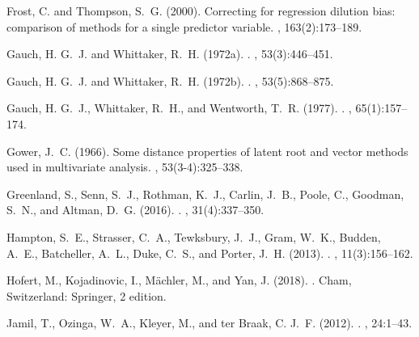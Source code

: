 \documentclass[a4paper,11pt]{article}
\begin{document}
\begin{thebibliography}{}
Frost, C. and Thompson, S.~G. (2000).
\newblock Correcting for regression dilution bias: comparison of methods for a
  single predictor variable.
, 163(2):173--189.

{Gauch}, H. G.~J. and Whittaker, R.~H. (1972a).
.
, 53(3):446--451.

{Gauch}, H. G.~J. and Whittaker, R.~H. (1972b).
.
, 53(5):868--875.

{Gauch}, H. G.~J., Whittaker, R.~H., and Wentworth, T.~R. (1977).
.
, 65(1):157--174.

Gower, J.~C. (1966).
\newblock Some distance properties of latent root and vector methods used in
  multivariate analysis.
, 53(3-4):325--338.

Greenland, S., Senn, S.~J., Rothman, K.~J., Carlin, J.~B., Poole, C., Goodman,
  S.~N., and Altman, D.~G. (2016).
.
, 31(4):337--350.

Hampton, S.~E., Strasser, C.~A., Tewksbury, J.~J., Gram, W.~K., Budden, A.~E.,
  Batcheller, A.~L., Duke, C.~S., and Porter, J.~H. (2013).
.
, 11(3):156--162.

Hofert, M., Kojadinovic, I., M\"{a}chler, M., and Yan, J. (2018).
.
\newblock Cham, Switzerland: Springer, 2 edition.

Jamil, T., Ozinga, W.~A., Kleyer, M., and ter Braak, C. J.~F. (2012).
.
, 24:1--43.


\end{thebibliography}
\end{document}
